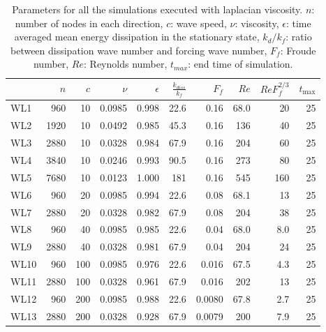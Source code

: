 \begin{table}
\begin{center}

\label{Table2}

\begin{tabular}{lrrrrrrrrr}
\toprule
{} &  $n$ &  $c$ &  $\nu $ &  $\epsilon$ &  $\frac{k_{diss}}{k_f}$ &   $F_f$ &  $\; Re$ &  $ReF_f^{2/3} $ &  $t_{\max}$ \\
\midrule
WL1  &  960 &   10 &   0.0985 &       0.998 &                    22.6 &   0.16 &  68.0 &           20 &          25 \\
WL2  & 1920 &   10 &   0.0492 &       0.985 &                    45.3 &    0.16 &  136 &           40 &          25 \\
WL3  & 2880 &   10 &   0.0328 &       0.984 &                    67.9 &    0.16 &    204 &           60 &          25 \\
WL4  & 3840 &   10 &   0.0246 &       0.993 &                    90.5 &   0.16 &   273 &            80 &          25 \\
WL5  & 7680 &   10 &   0.0123 &       1.000 &                     181 &   0.16 &   545 &           160 &          25 \\
WL6  &  960 &   20 &   0.0985 &       0.994 &                    22.6 &  0.08 &  68.1&            13 &          25 \\
WL7  & 2880 &   20 &   0.0328 &       0.982 &                    67.9 &    0.08 &  204 &           38 &          25 \\
WL8  &  960 &   40 &   0.0985 &       0.985 &                    22.6 &    0.04 &  68.0 &           8.0 &          25 \\
WL9  & 2880 &   40 &   0.0328 &       0.981 &                    67.9 &    0.04 &  204 &            24 &          25 \\
WL10 &  960 &  100 &   0.0985 &       0.976 &                    22.6 &   0.016 &  67.5 &            4.3 &          25 \\
WL11 & 2880 &  100 &   0.0328 &       0.961 &                    67.9 &  0.016 &  202 &           13 &          25 \\
WL12 &  960 &  200 &   0.0985 &       0.988 &                    22.6 & 0.0080 &  67.8 &          2.7 &          25 \\
WL13 & 2880 &  200 &   0.0328 &       0.928 &                    67.9 & 0.0079 &  200 &           7.9&          25 \\
\bottomrule
\end{tabular}

\caption{Parameters for all the simulations executed with laplacian viscosity.
$ n $: number of nodes in each direction, $ c $: wave speed, $ \nu  $:  viscosity, $ \epsilon $: time
averaged mean energy dissipation in the stationary state, $ k_{d}/ k_f $: ratio
between dissipation wave number and forcing wave number, $F_f $: Froude
number, $Re$: Reynolds number, $ t_{max} $: end time of simulation.}
\end{center}
\end{table}

